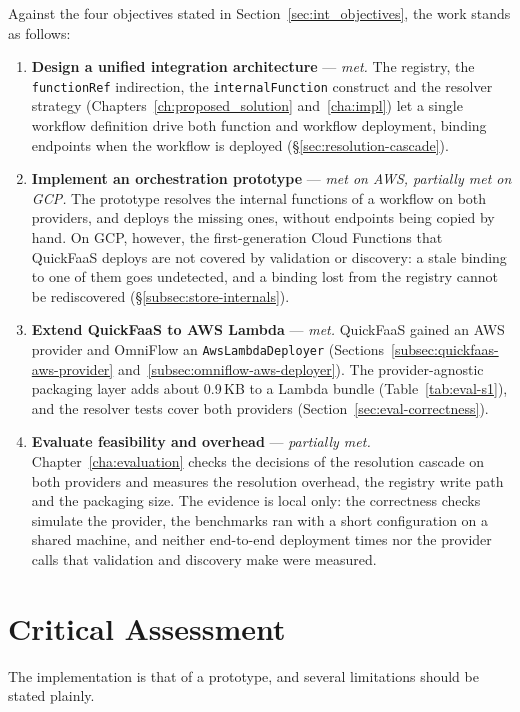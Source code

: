 Against the four objectives stated in Section~\ref{sec:int_objectives}, the work stands as
follows:
\begin{enumerate}
  \item \textbf{Design a unified integration architecture} --- \emph{met.} The registry, the
  \texttt{functionRef} indirection, the \texttt{internalFunction} construct and the resolver
  strategy (Chapters~\ref{ch:proposed_solution} and~\ref{cha:impl}) let a single workflow
  definition drive both function and workflow deployment, binding endpoints when the workflow is
  deployed (\S\ref{sec:resolution-cascade}).
  \item \textbf{Implement an orchestration prototype} --- \emph{met on AWS, partially met on GCP.}
  The prototype resolves the internal functions of a workflow on both providers, and deploys the
  missing ones, without endpoints being copied by hand. On GCP, however, the first-generation Cloud
  Functions that QuickFaaS deploys are not covered by validation or discovery: a stale binding to
  one of them goes undetected, and a binding lost from the registry cannot be rediscovered
  (\S\ref{subsec:store-internals}).
  \item \textbf{Extend QuickFaaS to AWS Lambda} --- \emph{met.} QuickFaaS gained an AWS provider
  and OmniFlow an \texttt{AwsLambdaDeployer} (Sections~\ref{subsec:quickfaas-aws-provider}
  and~\ref{subsec:omniflow-aws-deployer}). The provider-agnostic packaging layer adds about
  0.9\,KB to a Lambda bundle (Table~\ref{tab:eval-s1}), and the resolver tests cover both
  providers (Section~\ref{sec:eval-correctness}).
  \item \textbf{Evaluate feasibility and overhead} --- \emph{partially met.}
  Chapter~\ref{cha:evaluation} checks the decisions of the resolution cascade on both providers
  and measures the resolution overhead, the registry write path and the packaging size. The
  evidence is local only: the correctness checks simulate the provider, the benchmarks ran with a
  short configuration on a shared machine, and neither end-to-end deployment times nor the
  provider calls that validation and discovery make were measured.
\end{enumerate}

\section{Critical Assessment}
\label{sec:concl-critical}

The implementation is that of a prototype, and several limitations should be stated plainly.

